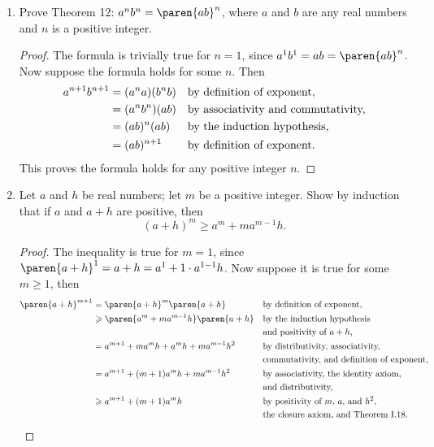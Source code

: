 \documentclass[a4paper]{article}
\begin{document}
\begin{enumerate}
\item Prove Theorem 12: \(a^n b^n = \paren{ab}^n\), where \(a\) and
  \(b\) are any real numbers and \(n\) is a positive integer.

  \begin{proof}
    The formula is trivially true for \(n=1\), since
    \(a^1 b^1 = ab = \paren{ab}^n\).  Now suppose the formula holds
    for some \(n\).  Then
    \begin{align*}
      a^{n+1} b^{n+1}
      &= (a^n a) (b^n b) && \text{by definition of exponent,} \\
      &= (a^n b^n) (ab)  && \text{by associativity and commutativity,} \\
      &= (ab)^n (ab)     && \text{by the induction hypothesis,} \\
      &= (ab)^{n+1}      && \text{by definition of exponent.}
    \end{align*}
    This proves the formula holds for any positive integer \(n\).
  \end{proof}

\item Let \(a\) and \(h\) be real numbers; let \(m\) be a positive
  integer.  Show by induction that if \(a\) and \(a+h\) are positive,
  then
  \[
    (a+h)^m \ge a^m + ma^{m-1}h.
  \]

  \begin{proof}
    The inequality is true for \(m=1\), since
    \(\paren{a+h}^1 = a + h = a^1 + 1 \cdot a^{1-1} h\).  Now suppose it
    is true for some \(m \ge 1\), then
    \begin{align*}
      \paren{a+h}^{m+1}
      &= \paren{a+h}^m \paren{a+h}              && \reason{by definition of exponent,} \\
      &\ge \paren{a^m + ma^{m-1}h} \paren{a+h}  && \reason{by the induction hypothesis} \\
      &                                         && \reason{and positivity of \(a+h\),} \\
      &= a^{m+1} + ma^m h + a^m h + ma^{m-1}h^2 && \reason{by distributivity, associativity,} \\
      &                                         && \reason{commutativity, and definition of exponent,} \\
      &= a^{m+1} + (m+1)a^m h + ma^{m-1}h^2     && \reason{by associativity, the identity axiom,} \\
      &                                         && \reason{and distributivity,} \\
      &\ge a^{m+1} + (m+1)a^m h                 && \reason{by positivity of \(m\), \(a\), and \(h^2\),} \\
      &                                         && \reason{the closure axiom, and Theorem I.18.} \qedhere
    \end{align*}
  \end{proof}


\end{enumerate}
\end{document}
